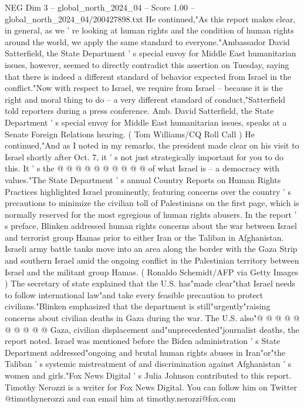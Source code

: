 \begin{textsample}{NEG Dim 3 – global\_north\_2024\_04 – Score 1.00 – global\_north\_2024\_04/200427898.txt}  \label{ex:f3_neg_408}
He continued,"As this report makes clear, in general, as we ' re looking at human rights and the condition of human rights around the world, we apply the same standard to everyone."Ambassador David Satterfield, the State Department ' s special envoy for Middle East humanitarian issues, however, seemed to directly contradict this assertion on Tuesday, saying that there is indeed a different standard of behavior expected from Israel in the conflict."Now with respect to Israel, we require from Israel -- because it is the right and moral thing to do -- a very different standard of conduct,"Satterfield told reporters during a press conference.
Amb.
David Satterfield, the State Department ' s special envoy for Middle East humanitarian issues, speaks at a Senate Foreign Relations hearing. ( Tom Williams/CQ Roll Call ) He continued,"And as I noted in my remarks, the president made clear on his visit to Israel shortly after Oct. 7, it ' s not just strategically important for you to do this.
It ' s the @ @ @ @ @ @ @ @ @ @ of what Israel is -- a democracy with values."The State Department ' s annual Country Reports on Human Rights Practices highlighted Israel prominently, featuring concerns over the country ' s precautions to minimize the civilian toll of Palestinians on the first page, which is normally reserved for the most egregious of human rights abusers.
In the report ' s preface, Blinken addressed human rights concerns about the war between Israel and terrorist group Hamas prior to either Iran or the Taliban in Afghanistan.
Israeli army battle tanks move into an area along the border with the Gaza Strip and southern Israel amid the ongoing conflict in the Palestinian territory between Israel and the militant group Hamas. ( Ronaldo Schemidt/AFP via Getty Images ) The secretary of state explained that the U.S. has"made clear"that Israel needs to follow international law"and take every feasible precaution to protect civilians."Blinken emphasized that the department is still"urgently"raising concerns about civilian deaths in Gaza during the war.
The U.S. also"@ @ @ @ @ @ @ @ @ @ Gaza, civilian displacement and"unprecedented"journalist deaths, the report noted.
Israel was mentioned before the Biden administration ' s State Department addressed"ongoing and brutal human rights abuses in Iran"or"the Taliban ' s systemic mistreatment of and discrimination against Afghanistan ' s women and girls."Fox News Digital ' s Julia Johnson contributed to this report.
Timothy Nerozzi is a writer for Fox News Digital.
You can follow him on Twitter @timothynerozzi and can email him at timothy.nerozzi@fox.com

\end{textsample}
